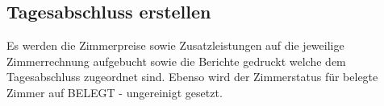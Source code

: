 \documentclass[../SubfileFeatures.tex]{subfiles}
\begin{document}
    \subsection{Tagesabschluss erstellen}
	Es werden die Zimmerpreise sowie Zusatzleistungen auf die jeweilige Zimmerrechnung aufgebucht
	sowie die Berichte gedruckt welche dem Tagesabschluss zugeordnet sind. Ebenso wird der Zimmerstatus
	für belegte Zimmer auf BELEGT - ungereinigt gesetzt.
\end{document}
